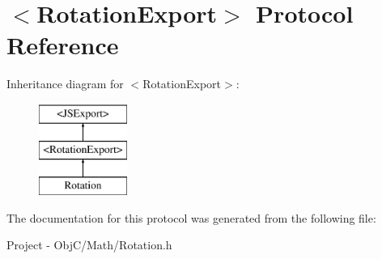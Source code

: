 \hypertarget{protocol_rotation_export-p}{}\section{$<$Rotation\+Export$>$ Protocol Reference}
\label{protocol_rotation_export-p}
Inheritance diagram for $<$Rotation\+Export$>$\+:\begin{figure}[H]
\begin{center}
\leavevmode
\includegraphics[height=3.000000cm]{protocol_rotation_export-p}
\end{center}
\end{figure}


The documentation for this protocol was generated from the following file\+:\begin{DoxyCompactItemize}
\item 
Project -\/ Obj\+C/\+Math/Rotation.\+h\end{DoxyCompactItemize}
